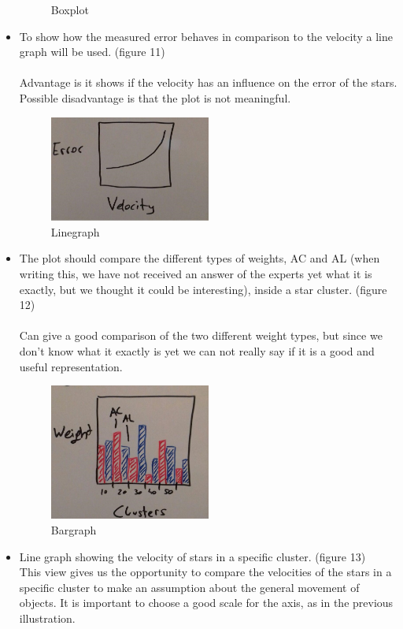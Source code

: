 \documentclass{article}
\begin{document}
\begin{itemize}
\begin{figure}[!h]
	\caption{Boxplot }
	\label{fig10}
\end{figure}
\item To show how the measured error behaves in comparison to the velocity a line graph will be used. (figure 11)\\
\\
Advantage is it shows if the velocity has an influence on the error of the stars. Possible disadvantage is that the plot is not meaningful.
\begin{figure}[!h]
\centering
\includegraphics[width=0.5\textwidth]{images/VelocityError.jpg}
	\caption{Linegraph  }
	\label{fig11}
\end{figure}
\newpage\item The plot should compare the different types of weights, AC and AL (when writing this, we have not received an answer of the experts yet what it is exactly, but we thought it could be interesting), inside a star cluster. (figure 12)\\
\\
Can give a good comparison of the two different weight types, but since we don't know what it exactly is yet we can not really say if it is a good and useful representation.
\begin{figure}[!h]
\centering
\includegraphics[width=0.5\textwidth]{images/ClustersWeight.jpg}
	\caption{Bargraph  }
	\label{fig12}
\end{figure}


\item Line graph showing the velocity of stars in a specific cluster. (figure 13)\\
This view gives us the opportunity to compare the velocities of the stars in a specific cluster to make an assumption about the general movement of objects. It is important to choose a good scale for the axis, as in the previous illustration. 
\end{itemize}
\end{document}
